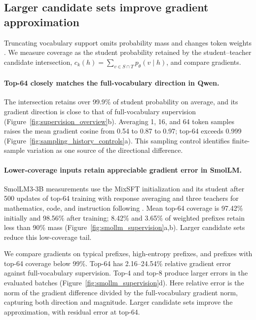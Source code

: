 \subsection{Larger candidate sets improve gradient approximation}
\label{sec:coverage_gradient}

Truncating vocabulary support omits probability mass and changes token weights \citep{anshumann2025sparse,huang2026tailaware}. We measure coverage as the student probability retained by the student--teacher candidate intersection, $c_k(h)=\sum_{v\in S\cap T}p_\theta(v\mid h)$, and compare gradients.

\paragraph{Top-64 closely matches the full-vocabulary direction in Qwen.}
The intersection retains over 99.9\% of student probability on average, and its gradient direction is close to that of full-vocabulary supervision (Figure~\ref{fig:supervision_overview}b). Averaging 1, 16, and 64 token samples raises the mean gradient cosine from 0.54 to 0.87 to 0.97; top-64 exceeds 0.999 (Figure~\ref{fig:sampling_history_controls}a). This sampling control identifies finite-sample variation as one source of the directional difference.

\paragraph{Lower-coverage inputs retain appreciable gradient error in SmolLM.}
SmolLM3-3B measurements use the MixSFT initialization and its student after 500 updates of top-64 training with response averaging and three teachers for mathematics, code, and instruction following \citep{gao2026openmopddiagnosingfixingcapability}. Mean top-64 coverage is 97.42\% initially and 98.56\% after training; 8.42\% and 3.65\% of weighted prefixes retain less than 90\% mass (Figure~\ref{fig:smollm_supervision}a,b). Larger candidate sets reduce this low-coverage tail.

We compare gradients on typical prefixes, high-entropy prefixes, and prefixes with top-64 coverage below 99\%. Top-64 has 2.16--24.54\% relative gradient error against full-vocabulary supervision. Top-4 and top-8 produce larger errors in the evaluated batches (Figure~\ref{fig:smollm_supervision}d). Here relative error is the norm of the gradient difference divided by the full-vocabulary gradient norm, capturing both direction and magnitude. Larger candidate sets improve the approximation, with residual error at top-64.

